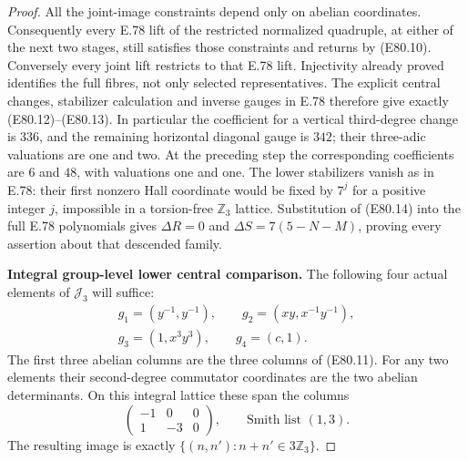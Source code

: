 \begin{proof}
All the joint-image constraints depend only on
abelian coordinates. Consequently every E.78 lift
of the restricted normalized quadruple, at either
of the next two stages, still satisfies those
constraints and returns by (E80.10). Conversely
every joint lift restricts to that E.78 lift.
Injectivity already proved identifies the full
fibres, not only selected representatives. The
explicit central changes, stabilizer calculation
and inverse gauges in E.78 therefore give exactly
(E80.12)--(E80.13). In particular the coefficient
for a vertical third-degree change is $336$, and
the remaining horizontal diagonal gauge is $342$;
their three-adic valuations are one and two.
At the preceding step the corresponding coefficients
are $6$ and $48$, with valuations one and one.
The lower stabilizers vanish as in E.78: their
first nonzero Hall coordinate would be fixed by
$7^j$ for a positive integer $j$, impossible in
a torsion-free $\mathbb Z_3$ lattice.
Substitution of (E80.14) into the full E.78
polynomials gives $\Delta R=0$ and
$\Delta S=7(5-N-M)$, proving every assertion
about that descended family.

\textbf{Integral group-level lower central comparison.}
The following four actual elements of $\mathcal J_3$
will suffice:
\[
 \begin{gathered}
 g_1=(y^{-1},y^{-1}),\qquad
 g_2=(xy,x^{-1}y^{-1}),\\
 g_3=(1,x^3y^3),\qquad g_4=(c,1).
 \end{gathered}
 \tag{E80.23}
\]
The first three abelian columns are the three
columns of (E80.11). For any two elements their
second-degree commutator coordinates are the two
abelian determinants. On this integral lattice
these span the columns
\[
       \begin{pmatrix}-1&0&0\\1&-3&0\end{pmatrix},
       \qquad\text{Smith list }(1,3).
 \tag{E80.24}
\]
The resulting image is exactly
$\{(n,n'):n+n'\in3\mathbb Z_3\}$.


\end{proof}
